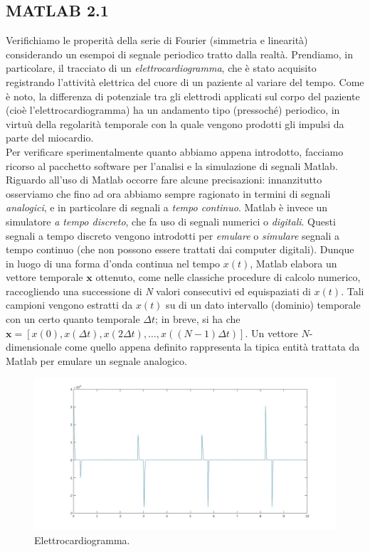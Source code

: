 \documentclass[12pt,oneside,openany]{memoir}
\numberwithin{equation}{subsection}
\begin{document}
\subsection{MATLAB 2.1}
Verifichiamo le properit\`a della serie di Fourier (simmetria e linearit\`a) considerando un esempoi di segnale periodico tratto dalla realt\`a. Prendiamo, in particolare, il tracciato di un \textit{elettrocardiogramma}, che \`e stato acquisito registrando l'attivit\`a elettrica del cuore di un paziente al variare del tempo. Come \`e noto, la differenza di potenziale tra gli elettrodi applicati sul corpo del paziente (cio\`e l'elettrocardiogramma) ha un andamento tipo (pressoch\'e) periodico, in virtu\`u della regolarit\`a temporale con la quale vengono prodotti gli impulsi da parte del miocardio.\\
Per verificare sperimentalmente quanto abbiamo appena introdotto, facciamo ricorso al pacchetto software per l'analisi e la simulazione di segnali Matlab. Riguardo all'uso di Matlab occorre fare alcune precisazioni: innanzitutto osserviamo che fino ad ora abbiamo sempre ragionato in termini di segnali \textit{analogici}, e in particolare di segnali a \textit{tempo continuo}. Matlab \`e invece un simulatore \textit{a tempo discreto}, che fa uso di segnali numerici o \textit{digitali}. Questi segnali a tempo discreto vengono introdotti per \textit{emulare} o \textit{simulare} segnali a tempo continuo (che non possono essere trattati dai computer digitali). Dunque in luogo di una forma d'onda continua nel tempo $x(t)$, Matlab elabora un vettore temporale $\boldsymbol{x}$ ottenuto, come nelle classiche procedure di calcolo numerico, raccogliendo una successione di \textit{N} valori consecutivi ed equispaziati di $x(t)$. Tali campioni vengono estratti da $x(t)$ su di un dato intervallo (dominio) temporale con un certo quanto temporale $\Delta t$; in breve, si ha che $\boldsymbol{x} = [x(0), x(\Delta t), x(2 \Delta t), \dots, x((N - 1)\Delta t)]$. Un vettore $N$-dimensionale come quello appena definito rappresenta la tipica entit\`a trattata da Matlab per emulare un segnale analogico.
\begin{figure}[H]
\centering
\captionsetup{justification=centering}
\includegraphics[width=1.0\textwidth]{images/matlab_ecg_signal.jpg}
\caption{Elettrocardiogramma.}
\end{figure}
\end{document}
